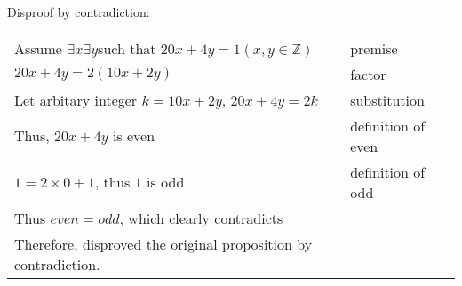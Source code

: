 \documentclass[12pt]{exam}
\begin{document}
\begin{solution}
	Disproof by contradiction:\\
	\begin{tabular}{ll}
		Assume $\exists x \exists y$such that $20x + 4y=1(x,y \in \mathbb{Z})$ & premise            \\
		$20x+4y=2(10x+2y)$                                                     & factor             \\
		Let arbitary integer $k=10x+2y$, $20x+4y=2k$                           & substitution       \\
		Thus, $20x+4y$ is even                                                 & definition of even \\
		$1=2 \times 0 + 1$, thus $1$ is odd                                    & definition of odd  \\
		Thus $even = odd$, which clearly contradicts                                                \\
		Therefore, disproved the original proposition by contradiction.
	\end{tabular}
\end{solution}
\end{document}
